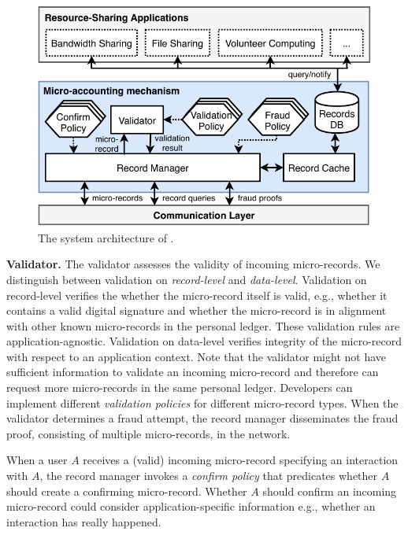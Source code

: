 \begin{figure}[b]
	\centering
	\includegraphics[width=\linewidth]{trustchain/assets/system_architecture}
	\caption{The system architecture of \ModelName{}.}
	\label{fig:system_architecture}
\end{figure}

\textbf{Validator.}
The validator assesses the validity of incoming micro-records.
We distinguish between validation on \emph{record-level} and \emph{data-level}.
Validation on record-level verifies the whether the micro-record itself is valid, e.g., whether it contains a valid digital signature and whether the micro-record is in alignment with other known micro-records in the personal ledger.
These validation rules are application-agnostic.
Validation on data-level verifies integrity of the micro-record with respect to an application context.
Note that the validator might not have sufficient information to validate an incoming micro-record and therefore can request more micro-records in the same personal ledger.
Developers can implement different \emph{validation policies} for different micro-record types.
When the validator determines a fraud attempt, the record manager disseminates the fraud proof, consisting of multiple micro-records, in the network.

When a user $ A $  receives a (valid) incoming micro-record specifying an interaction with $ A $, the record manager invokes a \emph{confirm policy} that predicates whether $ A $ should create a confirming micro-record.
Whether $ A $ should confirm an incoming micro-record could consider application-specific information e.g., whether an interaction has really happened.


